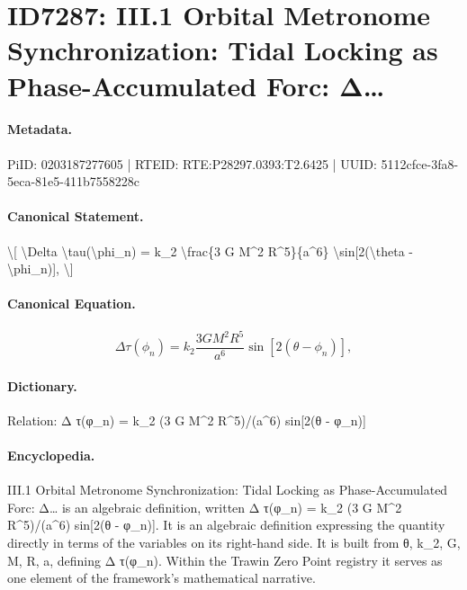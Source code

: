 \section*{ID7287: III.1 Orbital Metronome Synchronization: Tidal Locking as Phase-Accumulated Forc: Δ…}
\paragraph{Metadata.}
PiID: 0203187277605 | RTEID: RTE:P28297.0393:T2.6425 | UUID: 5112cfce-3fa8-5eca-81e5-411b7558228c

\paragraph{Canonical Statement.}
\textbackslash{}[ \textbackslash{}Delta \textbackslash{}tau(\textbackslash{}phi\_n) = k\_2 \textbackslash{}frac\{3 G M\textasciicircum{}2 R\textasciicircum{}5\}\{a\textasciicircum{}6\} \textbackslash{}sin[2(\textbackslash{}theta - \textbackslash{}phi\_n)], \textbackslash{}]

\paragraph{Canonical Equation.}
\[
\Delta \tau(\phi_n) = k_2 \frac{3 G M^2 R^5}{a^6} \sin[2(\theta - \phi_n)],
\]

\paragraph{Dictionary.}
Relation: Δ τ(φ\_n) = k\_2 (3 G M\textasciicircum{}2 R\textasciicircum{}5)/(a\textasciicircum{}6) sin[2(θ - φ\_n)]

\paragraph{Encyclopedia.}
III.1 Orbital Metronome Synchronization: Tidal Locking as Phase-Accumulated Forc: Δ… is an algebraic definition, written Δ τ(φ\_n) = k\_2 (3 G M\textasciicircum{}2 R\textasciicircum{}5)/(a\textasciicircum{}6) sin[2(θ - φ\_n)]. It is an algebraic definition expressing the quantity directly in terms of the variables on its right-hand side. It is built from θ, k\_2, G, M, R, a, defining Δ τ(φ\_n). Within the Trawin Zero Point registry it serves as one element of the framework's mathematical narrative.
